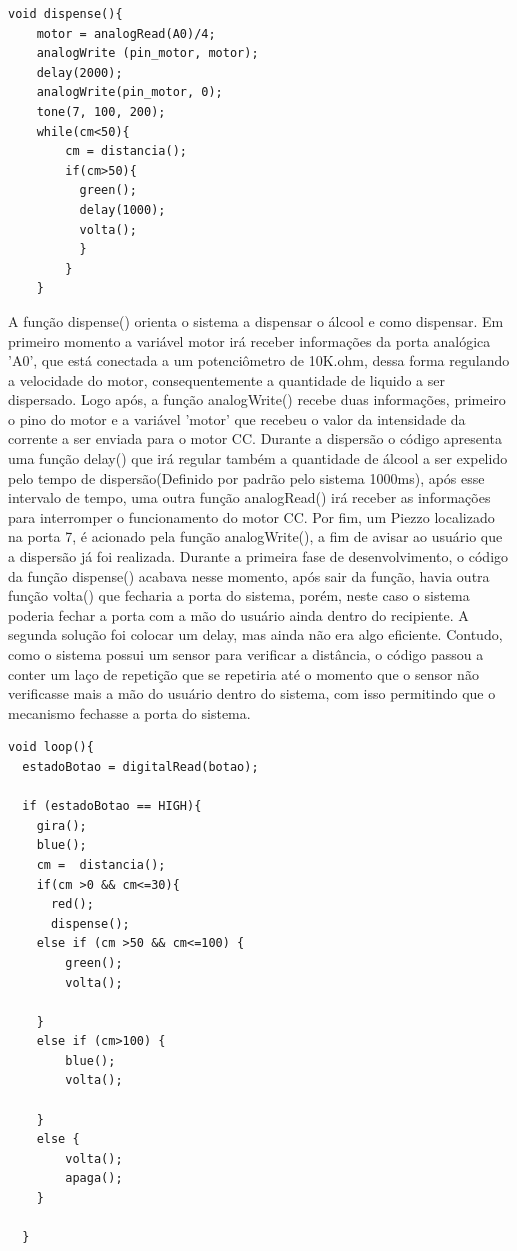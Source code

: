 \documentclass[conference]{IEEEtran}
\begin{document}
        \begin{lstlisting}
void dispense(){
    motor = analogRead(A0)/4;
    analogWrite (pin_motor, motor);
    delay(2000);
    analogWrite(pin_motor, 0);
    tone(7, 100, 200);
    while(cm<50){
        cm = distancia();
        if(cm>50){ 
          green();
          delay(1000); 
          volta();
          }
    	}
	}
        \end{lstlisting}
        A função dispense() orienta o sistema a dispensar o álcool
        e como dispensar. Em primeiro momento a variável motor
        irá receber informações da porta analógica ’A0’, que está
        conectada a um potenciômetro de 10K.ohm, dessa forma
        regulando a velocidade do motor, consequentemente a quantidade 
        de liquido a ser dispersado. Logo após, a função
        analogWrite() recebe duas informações, primeiro o pino do
        motor e a variável ’motor’ que recebeu o valor da intensidade
        da corrente a ser enviada para o motor CC. Durante a dispersão
        o código apresenta uma função delay() que irá regular também
        a quantidade de álcool a ser expelido pelo tempo de dispersão(Definido por padrão pelo sistema 1000ms),
        após esse intervalo de tempo, uma outra função analogRead()
        irá receber as informações para interromper o funcionamento
        do motor CC. Por fim, um Piezzo localizado na porta 7, é
        acionado pela função analogWrite(), a fim de avisar ao usuário
        que a dispersão já foi realizada. Durante a primeira fase de
        desenvolvimento, o código da função dispense() acabava nesse
        momento, após sair da função, havia outra função volta()
        que fecharia a porta do sistema, porém, neste caso o sistema
        poderia fechar a porta com a mão do usuário ainda dentro do recipiente. 
        A segunda solução foi colocar um delay, mas ainda não era algo eficiente.
        Contudo, como o sistema possui um sensor para verificar
        a distância, o código passou a conter um laço de repetição 
        que se repetiria até o momento que o sensor não verificasse mais a mão
        do usuário dentro do sistema, com isso permitindo que o
        mecanismo fechasse a porta do sistema.
        \begin{lstlisting}
void loop(){
  estadoBotao = digitalRead(botao);          

  if (estadoBotao == HIGH){
    gira();
    blue();
    cm =  distancia();
    if(cm >0 && cm<=30){ 
      red(); 
      dispense(); 
    else if (cm >50 && cm<=100) {
        green();
        volta();

    }
    else if (cm>100) {
        blue();
        volta();

    }
    else {
        volta();
        apaga();
    }   
 
  }
        \end{lstlisting}
\end{document}
